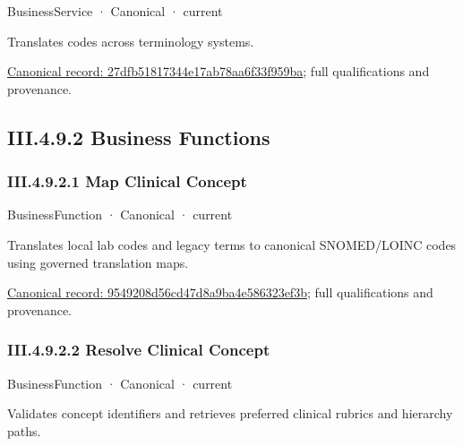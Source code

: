 \label{element:27dfb51817344e17ab78aa6f33f959ba}
{\small BusinessService · Canonical · current}\par

Translates codes across terminology systems.


{\footnotesize \href{../../../../continuum/business/business-service/27dfb51817344e17ab78aa6f33f959ba.md}{Canonical record: 27dfb51817344e17ab78aa6f33f959ba}; full qualifications and provenance.}\par
\subsection*{III.4.9.2 Business Functions}
\label{navigation:III.4.9.2}

\subsubsection*{III.4.9.2.1 Map Clinical Concept}
\label{navigation:III.4.9.2.1}

\label{element:9549208d56cd47d8a9ba4e586323ef3b}
{\small BusinessFunction · Canonical · current}\par

Translates local lab codes and legacy terms to canonical SNOMED/LOINC codes using governed translation maps.


{\footnotesize \href{../../../../continuum/business/business-function/9549208d56cd47d8a9ba4e586323ef3b.md}{Canonical record: 9549208d56cd47d8a9ba4e586323ef3b}; full qualifications and provenance.}\par
\subsubsection*{III.4.9.2.2 Resolve Clinical Concept}
\label{navigation:III.4.9.2.2}

\label{element:8f89eacbc53b4697b5a747db2e143510}
{\small BusinessFunction · Canonical · current}\par

Validates concept identifiers and retrieves preferred clinical rubrics and hierarchy paths.


